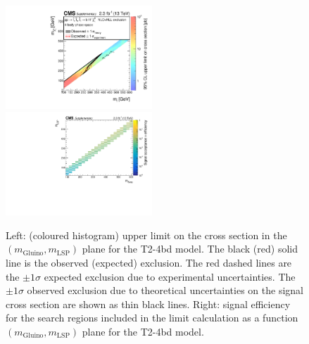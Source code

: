 \begin{figure}[t]
  \begin{center}
    \includegraphics[width=0.49\textwidth]{RA1T2-4bdXSEC_aux} \, 
    \includegraphics[width=0.49\textwidth]{T2-4bd_merging_4_cats_aux} \,     
  \end{center}
  \caption{Left: (coloured histogram) upper limit on the cross section in the $(m_{\mathrm{Gluino}},m_{\mathrm{LSP}})$ plane for the T2-4bd model. 
  The black (red) solid line is the observed (expected) exclusion. The red dashed lines are the $\pm1\sigma$ expected exclusion due to experimental uncertainties. 
  The $\pm1\sigma$ observed exclusion due to theoretical uncertainties on the signal cross section are shown as thin black lines. 
  Right: signal efficiency for the search regions included in the limit calculation as a function $(m_{\mathrm{Gluino}},m_{\mathrm{LSP}})$ plane for the T2-4bd model. 
  \label{fig:T2-4bd_excl}}
\end{figure}



